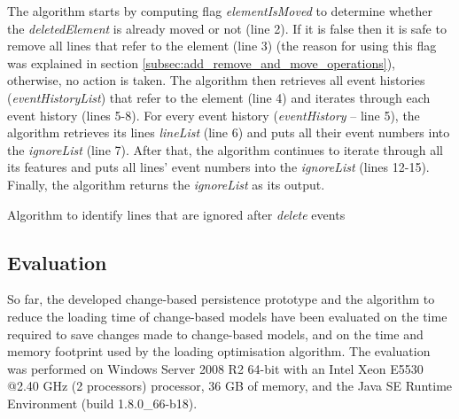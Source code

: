 \documentclass[12pt, a4paper]{report} \usepackage[titletoc]{appendix}
\begin{document}
The algorithm starts by computing flag \emph{elementIsMoved} to determine whether the \emph{deletedElement} is already moved or not (line 2).
If it is false then it is safe to remove all lines that refer to the element (line 3) (the reason for using this flag was explained in section \ref{subsec:add_remove_and_move_operations}), otherwise, no action is taken. The algorithm then retrieves all event histories (\emph{eventHistoryList}) that refer to the element (line 4) and iterates through each event history (lines 5-8). For every event history (\emph{eventHistory} -- line 5), the algorithm retrieves its lines \emph{lineList} (line 6) and puts all their event numbers into the \emph{ignoreList} (line 7). After that, the algorithm continues to iterate through all its features and puts all lines' event numbers into the \emph{ignoreList} (lines 12-15). Finally, the algorithm returns the \emph{ignoreList} as its output.

\begin{algorithm}[H]
    \begin{small}
    \end{small}
    \caption{Algorithm to identify lines that are ignored after \emph{delete} events}
    \label{alg:create_delete_optimisation}
\end{algorithm}


\subsection{Evaluation}
\label{subsec:evaluation}
So far, the developed change-based persistence prototype and the algorithm to reduce the loading time of change-based models have been evaluated on the time required to save changes made to change-based models, and on the time and memory footprint used by the loading optimisation algorithm. The evaluation was performed on Windows Server 2008 R2 64-bit with an Intel Xeon E5530 @2.40 GHz (2 processors) processor, 36 GB of memory, and the Java SE Runtime Environment (build 1.8.0\_66-b18).
\end{document}
